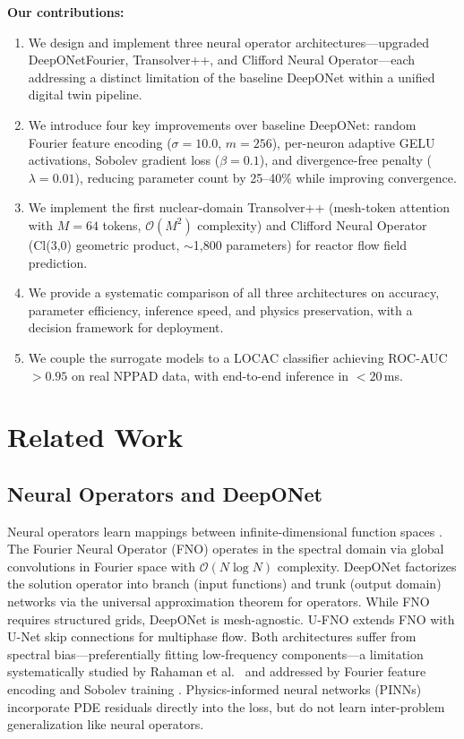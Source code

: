 \documentclass[conference]{IEEEtran}
\begin{document}
\textbf{Our contributions:}
\begin{enumerate}
    \item We design and implement three neural operator architectures---upgraded DeepONetFourier, Transolver++, and Clifford Neural Operator---each addressing a distinct limitation of the baseline DeepONet within a unified digital twin pipeline.
    \item We introduce four key improvements over baseline DeepONet: random Fourier feature encoding ($\sigma = 10.0$, $m = 256$), per-neuron adaptive GELU activations, Sobolev gradient loss ($\beta = 0.1$), and divergence-free penalty ($\lambda = 0.01$), reducing parameter count by 25--40\% while improving convergence.
    \item We implement the first nuclear-domain Transolver++ (mesh-token attention with $M = 64$ tokens, $\mathcal{O}(M^2)$ complexity) and Clifford Neural Operator (Cl(3,0) geometric product, $\sim$1,800 parameters) for reactor flow field prediction.
    \item We provide a systematic comparison of all three architectures on accuracy, parameter efficiency, inference speed, and physics preservation, with a decision framework for deployment.
    \item We couple the surrogate models to a LOCAC classifier achieving ROC-AUC $> 0.95$ on real NPPAD data, with end-to-end inference in $< 20$\,ms.
\end{enumerate}

\section{Related Work}
\label{sec:related}

\subsection{Neural Operators and DeepONet}
Neural operators learn mappings between infinite-dimensional function spaces \cite{lu2022comprehensive}. The Fourier Neural Operator (FNO) \cite{li2021fno} operates in the spectral domain via global convolutions in Fourier space with $\mathcal{O}(N \log N)$ complexity. DeepONet \cite{lu2021deeponet, chen1995} factorizes the solution operator into branch (input functions) and trunk (output domain) networks via the universal approximation theorem for operators. While FNO requires structured grids, DeepONet is mesh-agnostic. U-FNO \cite{wen2022u} extends FNO with U-Net skip connections for multiphase flow. Both architectures suffer from spectral bias---preferentially fitting low-frequency components---a limitation systematically studied by Rahaman et al.~\cite{rahaman2019spectral} and addressed by Fourier feature encoding \cite{tancik2020ffn} and Sobolev training \cite{son2021sobolev}. Physics-informed neural networks (PINNs) \cite{raissi2019pinn} incorporate PDE residuals directly into the loss, but do not learn inter-problem generalization like neural operators.
\end{document}
